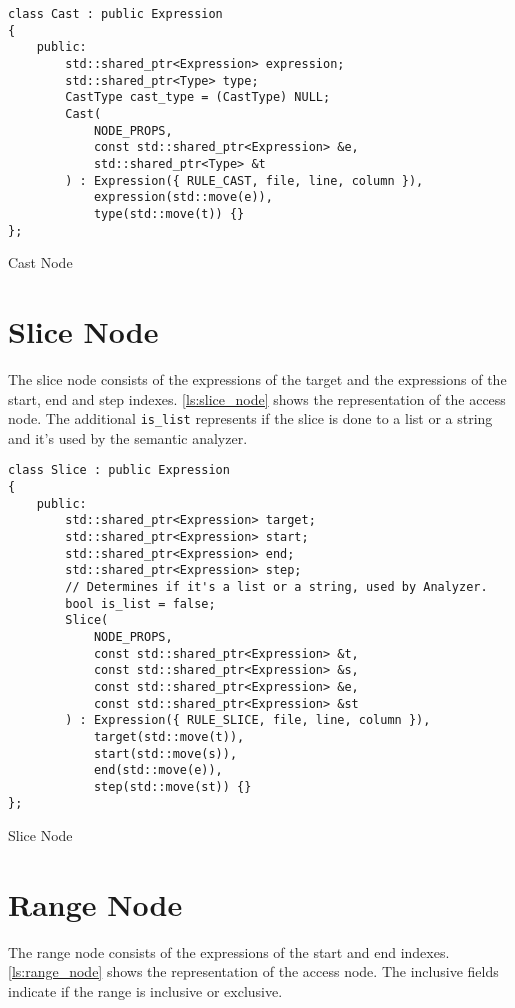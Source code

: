 \begin{listing}[H]
\begin{verbatim}
class Cast : public Expression
{
    public:
        std::shared_ptr<Expression> expression;
        std::shared_ptr<Type> type;
        CastType cast_type = (CastType) NULL;
        Cast(
            NODE_PROPS,
            const std::shared_ptr<Expression> &e,
            std::shared_ptr<Type> &t
        ) : Expression({ RULE_CAST, file, line, column }),
            expression(std::move(e)),
            type(std::move(t)) {}
};
\end{verbatim}
\caption{Cast Node}
\label{ls:cast_node}
\end{listing}

\section{Slice Node}

The slice node consists of the expressions of the target and the expressions of the start, end and step indexes.
\autoref{ls:slice_node} shows the representation of the access node.
The additional \texttt{is\_list} represents if the slice is done to a list or a string and it's used by the semantic analyzer.

\begin{listing}[H]
\begin{verbatim}
class Slice : public Expression
{
    public:
        std::shared_ptr<Expression> target;
        std::shared_ptr<Expression> start;
        std::shared_ptr<Expression> end;
        std::shared_ptr<Expression> step;
        // Determines if it's a list or a string, used by Analyzer.
        bool is_list = false;
        Slice(
            NODE_PROPS,
            const std::shared_ptr<Expression> &t,
            const std::shared_ptr<Expression> &s,
            const std::shared_ptr<Expression> &e,
            const std::shared_ptr<Expression> &st
        ) : Expression({ RULE_SLICE, file, line, column }),
            target(std::move(t)),
            start(std::move(s)),
            end(std::move(e)),
            step(std::move(st)) {}
};
\end{verbatim}
\caption{Slice Node}
\label{ls:slice_node}
\end{listing}

\section{Range Node}

The range node consists of the expressions of the start and end indexes.
\autoref{ls:range_node} shows the representation of the access node.
The inclusive fields indicate if the range is inclusive or exclusive.

